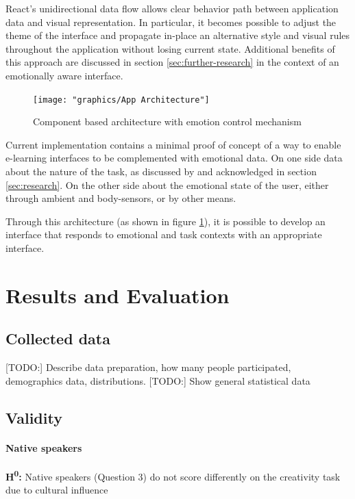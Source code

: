 React's unidirectional data flow allows clear behavior path between application data and visual representation. In particular, it becomes possible to adjust the theme of the interface and propagate in-place an alternative style and visual rules throughout the application without losing current state. Additional benefits of this approach are discussed in section \ref{sec:further-research} in the context of an emotionally aware interface.

\begin{figure}
	\centering
	\texttt{[image: "graphics/App Architecture"]}
	\caption{Component based architecture with emotion control mechanism}
	\label{fig:app-architecture}
\end{figure}

Current implementation contains a minimal proof of concept of a way to enable e-learning interfaces to be complemented with emotional data. On one side data about the nature of the task, as discussed by \cite{Haaranen2015} and acknowledged in section \ref{sec:research}. On the other side about the emotional state of the user, either through ambient and body-sensors, or by other means.

Through this architecture (as shown in figure \ref{fig:app-architecture}), it is possible to develop an interface that responds to emotional and task contexts with an appropriate interface.

\section{Results and Evaluation}

	\subsection{Collected data}
	
	[TODO:] Describe data preparation, how many people participated, demographics data, distributions.
	[TODO:] Show general statistical data
	
	\subsection{Validity} \label{sec:data-validity}
	
	\paragraph{Native speakers} 
	\textbf{H\textsuperscript{0}:}  Native speakers (Question 3) do not score differently on the creativity task due to cultural influence 
	
